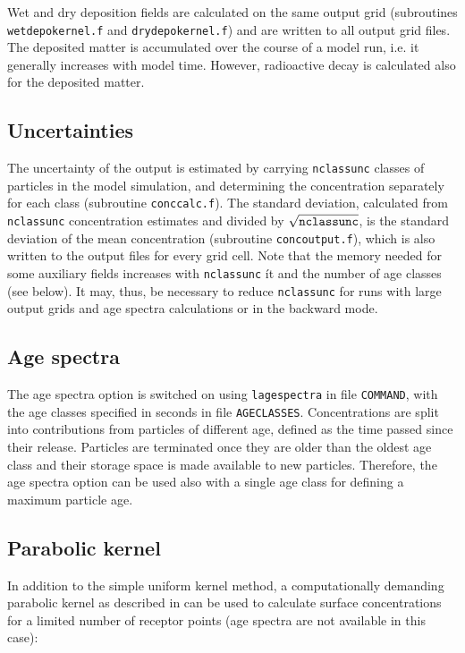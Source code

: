 \documentclass{egu}            %
\begin{document}
Wet and dry deposition fields are calculated on the same output grid
(subroutines \verb|wetdepokernel.f| and \verb|drydepokernel.f|) and are written
to all output grid files.  The deposited matter is accumulated over the course
of a model run, i.e.  it generally increases with model time.  However,
radioactive decay is calculated also for the deposited matter.

\subsection{Uncertainties}

The uncertainty of the output is estimated by carrying \verb|nclassunc| classes
of particles in the model simulation, and determining the concentration
separately for each class (subroutine \verb|conccalc.f|).  The standard
deviation, calculated from \verb|nclassunc| concentration estimates and divided
by $\sqrt{\tt{nclassunc}}$, is the standard deviation of the mean concentration
(subroutine \verb|concoutput.f|), which is also written to the output files for
every grid cell.  Note that the memory needed for some auxiliary fields
increases with \verb|nclassunc| {ít and} the number of age classes (see below).
It may, thus, be necessary to reduce \verb|nclassunc| for runs with large
output grids and age spectra calculations or in the backward mode.

\subsection{Age spectra}

The age spectra option is switched on using \verb|lagespectra| in file
\verb|COMMAND|, with the age classes specified in seconds in file
\verb|AGECLASSES|.  Concentrations are split into contributions from particles
of different age, defined as the time passed since their release.  Particles
are terminated once they are older than the oldest age class and their storage
space is made available to new particles.  Therefore, the age spectra option
can be used also with a single age class for defining a maximum particle age.

\subsection{Parabolic kernel}

In addition to the simple uniform kernel method, a computationally demanding
parabolic kernel as described in \citep{uliasz1994} can be used to calculate
surface concentrations for a limited number of receptor points (age spectra are
not available in this case):
\end{document}
